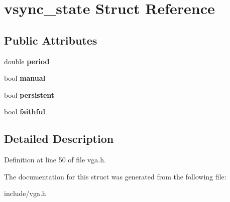 \hypertarget{structvsync__state}{\section{vsync\-\_\-state Struct Reference}
\label{structvsync__state}
}
\subsection*{Public Attributes}
\begin{DoxyCompactItemize}
\item 
\hypertarget{structvsync__state_ab31e356f8dda57db35c1424304ac5f44}{double {\bfseries period}}\label{structvsync__state_ab31e356f8dda57db35c1424304ac5f44}

\item 
\hypertarget{structvsync__state_a464f94268847e463a0ec9b7657661a86}{bool {\bfseries manual}}\label{structvsync__state_a464f94268847e463a0ec9b7657661a86}

\item 
\hypertarget{structvsync__state_a43ed386d0d457124256caad15f108bac}{bool {\bfseries persistent}}\label{structvsync__state_a43ed386d0d457124256caad15f108bac}

\item 
\hypertarget{structvsync__state_a23b2944857c4a4191aa0c73a7fc1929b}{bool {\bfseries faithful}}\label{structvsync__state_a23b2944857c4a4191aa0c73a7fc1929b}

\end{DoxyCompactItemize}


\subsection{Detailed Description}


Definition at line 50 of file vga.\-h.



The documentation for this struct was generated from the following file\-:\begin{DoxyCompactItemize}
\item 
include/vga.\-h\end{DoxyCompactItemize}
